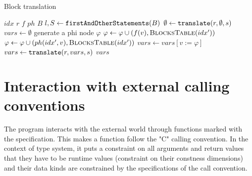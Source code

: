 \begin{algorithm}
    \caption{Block translation}
    \label{transl_block}
    \begin{algorithmic}[1]
        \Require $idx$ 
        \Require $r$ 
        \Require $f$ 
        \Require $ph$ 
        \Require $B$ 
        \State $l, S \gets \mathtt{firstAndOtherStatements}(B)$
        \State $\emptyset \gets \mathtt{translate}(r, \emptyset, s)$ 
        \State $vars \gets \emptyset$ 
            \State generate a phi node $\varphi$
                    \State $\varphi \gets \varphi \cup (f(v), \text{\textsc{BlocksTable}}(idx'))$
                \Else
                    \State $\varphi \gets \varphi \cup (ph(idx', v), \text{\textsc{BlocksTable}}(idx'))$
                \EndIf {}
            \EndFor
            \State $vars \gets vars[v := \varphi]$ 
        \EndFor
            \State $vars \gets \mathtt{translate} (r, vars, s)$ 
        \EndFor
        \State \Return $vars$
    \end{algorithmic}
\end{algorithm}


\section{Interaction with external calling conventions}

The program interacts with the external world through functions marked with the  specification. This makes a function follow the "C" calling convention. In the context of type system, it puts a constraint on all arguments and return values that they have to be runtime values (constraint on their constness dimensions) and their data kinds are constrained by the specifications of the call convention.
